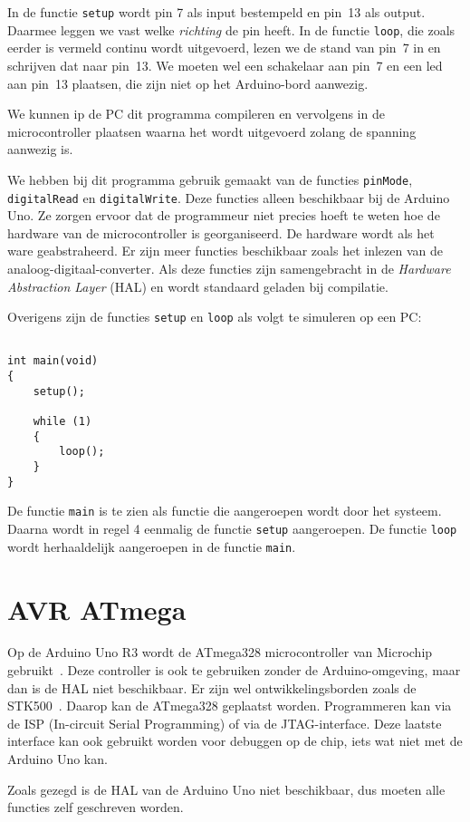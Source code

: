 In de functie \lstinline|setup| wordt pin 7 als input bestempeld en pin~13 als output. Daarmee leggen we vast welke \textsl{richting} de pin heeft. In de functie \lstinline|loop|, die zoals eerder is vermeld continu wordt uitgevoerd, lezen we de stand van pin~7 in en schrijven dat naar pin~13. We moeten wel een schakelaar aan pin~7 en een led aan pin~13 plaatsen, die zijn niet op het Arduino-bord aanwezig.

We kunnen ip  de PC dit programma compileren en vervolgens in de microcontroller plaatsen waarna het wordt uitgevoerd zolang de spanning aanwezig is.

We hebben bij dit programma gebruik gemaakt van de functies \lstinline|pinMode|, \lstinline|digitalRead| en \lstinline|digitalWrite|. Deze functies alleen beschikbaar bij de Arduino Uno. Ze zorgen ervoor dat de programmeur niet precies hoeft te weten hoe de hardware van de microcontroller is georganiseerd. De hardware wordt als het ware geabstraheerd. Er zijn meer functies beschikbaar zoals het inlezen van de analoog-digitaal-converter. Als deze functies zijn samengebracht in de \textsl{Hardware Abstraction Layer} (HAL) en wordt standaard geladen bij compilatie.

Overigens zijn de functies \lstinline|setup| en \lstinline|loop| als volgt te simuleren op een PC:

\begin{lstlisting}[caption=Simulatie van de functies \texttt{setup} en \texttt{loop}.]

int main(void)
{
    setup();

    while (1)
    {
        loop();
    }
}
\end{lstlisting}

De functie \lstinline|main| is te zien als functie die aangeroepen wordt door het systeem. Daarna wordt in regel 4 eenmalig de functie \lstinline|setup| aangeroepen. De functie \lstinline|loop| wordt herhaaldelijk aangeroepen in de functie \lstinline|main|.

\section{AVR ATmega}
Op de Arduino Uno R3 wordt de ATmega328 microcontroller van Microchip gebruikt~\cite{atmega328p}. Deze controller is ook te gebruiken zonder de Arduino-omgeving, maar dan is de HAL niet beschikbaar. Er zijn wel ontwikkelingsborden zoals de STK500~\cite{stk500}. Daarop kan de ATmega328 geplaatst worden. Programmeren kan via de ISP (In-circuit Serial Programming) of via de JTAG-interface. Deze laatste interface kan ook gebruikt worden voor debuggen op de chip, iets wat niet met de Arduino Uno kan.

Zoals gezegd is de HAL van de Arduino Uno niet beschikbaar, dus moeten alle functies zelf geschreven worden.